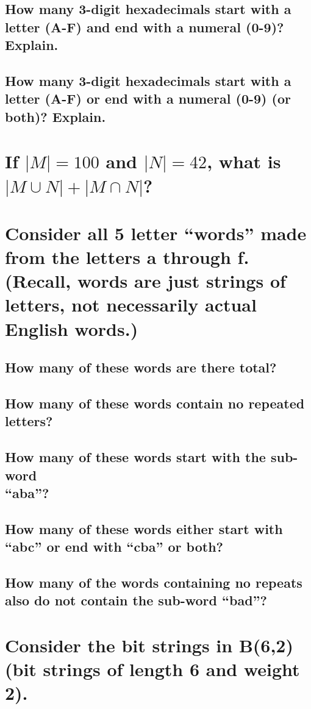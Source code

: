 \documentclass{article}
\begin{document}
\subsection{How many 3-digit hexadecimals start with a letter (A-F) and end with a numeral (0-9)? Explain.}
\subsection{How many 3-digit hexadecimals start with a letter (A-F) or end with a numeral (0-9) (or both)? Explain.}

\section{If $|M| = 100$ and $|N| = 42$, what is $|M\cup N|+|M\cap N|$?}

\clearpage

\section{Consider all 5 letter “words” made from the letters a through f.
 (Recall, words are just strings of letters, not necessarily actual English words.)}
\subsection{How many of these words are there total?}
\subsection{How many of these words contain no repeated letters?}
\subsection{How many of these words start with the sub-word \\ “aba”?}
\subsection{How many of these words either start with “abc” or end with “cba” or both?}
\subsection{How many of the words containing no repeats also do not contain the sub-word “bad”?}

\section{Consider the bit strings in B(6,2) (bit strings of length 6 and weight 2).}
\end{document}
